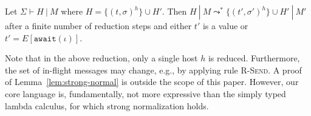 \begin{lem}\label{lem:strong-normal}
  Let $\Sigma \vdash H~|~M$ where $H = \{ (t, \sigma)^h \} \cup
  H'$. Then $H~|~M \leadsto^* \{ (t', \sigma')^h \} \cup H'~|~M'$
  after a finite number of reduction steps and either $t'$ is a value
  or $t' = E[\texttt{await}(\iota)]$.
\end{lem}

Note that in the above reduction, only a single host $h$ is
reduced. Furthermore, the set of in-flight messages may change, e.g.,
by applying rule \textsc{R-Send}. A proof of
Lemma~\ref{lem:strong-normal} is outside the scope of this
paper. However, our core language is, fundamentally, not more
expressive than the simply typed lambda calculus, for which strong
normalization holds.
